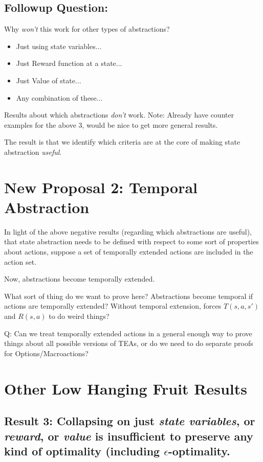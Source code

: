 \documentclass[11pt]{amsart}
\begin{document}
\subsection{Followup Question:} Why {\it won't} this work for other types of abstractions?
\begin{itemize}
\item Just using state variables...
\item Just Reward function at a state...
\item Just Value of state...
\item Any combination of these...
\end{itemize}

Results about which abstractions {\it don't} work. Note: Already have counter examples for the above 3, would be nice to get more general results.

The result is that we identify which criteria are at the core of making state abstraction {\it useful}.


\newpage
\section{New Proposal 2: Temporal Abstraction}

In light of the above negative results (regarding which abstractions are useful), that state abstraction needs to be defined with respect to some sort of properties about actions, suppose a set of temporally extended actions are included in the action set.

Now, abstractions become temporally extended.

What sort of thing do we want to prove here? Abstractions become temporal if actions are temporally extended? Without temporal extension, forces $T(s,a,s')$ and $R(s,a)$ to do weird things?

Q: Can we treat temporally extended actions in a general enough way to prove things about all possible versions of TEAs, or do we need to do separate proofs for Options/Macroactions?


\newpage
\section{Other Low Hanging Fruit Results}


\subsection{Result 3: Collapsing on just {\it state variables}, or {\it reward}, or {\it value} is insufficient to preserve any kind of optimality (including $\epsilon$-optimality.}
\end{document}
